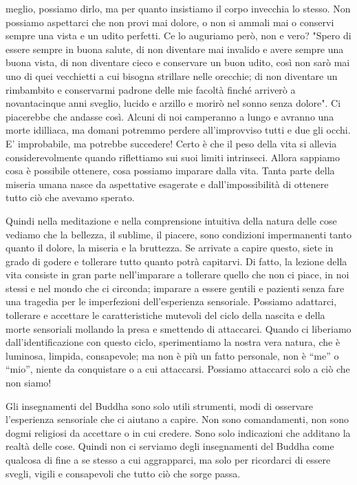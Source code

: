 meglio, possiamo dirlo, ma per quanto insistiamo il corpo invecchia lo
stesso. Non possiamo aspettarci che non provi mai dolore, o non si
ammali mai o conservi sempre una vista e un udito perfetti. Ce lo
auguriamo però, non e vero? "Spero di essere sempre in buona salute, di
non diventare mai invalido e avere sempre una buona vista, di non
diventare cieco e conservare un buon udito, così non sarò mai uno di
quei vecchietti a cui bisogna strillare nelle orecchie; di non diventare
un rimbambito e conservarmi padrone delle mie facoltà finché arriverò a
novantacinque anni sveglio, lucido e arzillo e morirò nel sonno senza
dolore". Ci piacerebbe che andasse così. Alcuni di noi camperanno a
lungo e avranno una morte idilliaca, ma domani potremmo perdere
all'improvviso tutti e due gli occhi. E' improbabile, ma potrebbe
succedere! Certo è che il peso della vita si allevia considerevolmente
quando riflettiamo sui suoi limiti intrinseci. Allora sappiamo cosa è
possibile ottenere, cosa possiamo imparare dalla vita. Tanta parte della
miseria umana nasce da aspettative esagerate e dall'impossibilità di
ottenere tutto ciò che avevamo sperato.

Quindi nella meditazione e nella comprensione intuitiva della natura
delle cose vediamo che la bellezza, il sublime, il piacere, sono
condizioni impermanenti tanto quanto il dolore, la miseria e la
bruttezza. Se arrivate a capire questo, siete in grado di godere e
tollerare tutto quanto potrà capitarvi. Di fatto, la lezione della vita
consiste in gran parte nell'imparare a tollerare quello che non ci
piace, in noi stessi e nel mondo che ci circonda; imparare a essere
gentili e pazienti senza fare una tragedia per le imperfezioni
dell'esperienza sensoriale. Possiamo adattarci, tollerare e accettare le
caratteristiche mutevoli del ciclo della nascita e della morte
sensoriali mollando la presa e smettendo di attaccarci. Quando ci
liberiamo dall'identificazione con questo ciclo, sperimentiamo la nostra
vera natura, che è luminosa, limpida, consapevole; ma non è più un fatto
personale, non è “me” o “mio”, niente da conquistare o a cui attaccarsi.
Possiamo attaccarci solo a ciò che non siamo!

Gli insegnamenti del Buddha sono solo utili strumenti, modi di osservare
l'esperienza sensoriale che ci aiutano a capire. Non sono comandamenti,
non sono dogmi religiosi da accettare o in cui credere. Sono solo
indicazioni che additano la realtà delle cose. Quindi non ci serviamo
degli insegnamenti del Buddha come qualcosa di fine a se stesso a cui
aggrapparci, ma solo per ricordarci di essere svegli, vigili e
consapevoli che tutto ciò che sorge passa.


